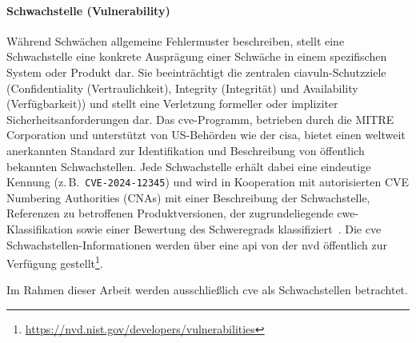 \paragraph{Schwachstelle (Vulnerability)}

Während Schwächen allgemeine Fehlermuster beschreiben, stellt eine Schwachstelle eine konkrete Ausprägung einer Schwäche in einem spezifischen System oder Produkt dar.
Sie beeinträchtigt die zentralen \acrshort{ciavuln}-Schutzziele (Confidentiality (Vertraulichkeit), Integrity (Integrität) und Availability (Verfügbarkeit)) und stellt eine Verletzung formeller oder impliziter Sicherheitsanforderungen dar.
Das \acrshort{cve}-Programm, betrieben durch die MITRE Corporation und unterstützt von US-Behörden wie der \acrfull{cisa}, bietet einen weltweit anerkannten Standard zur Identifikation und Beschreibung von öffentlich bekannten Schwachstellen.
Jede Schwachstelle erhält dabei eine eindeutige Kennung (z.\,B.\ \verb+CVE-2024-12345+) und wird in Kooperation mit autorisierten CVE Numbering Authorities (CNAs) mit einer Beschreibung der Schwachstelle, Referenzen zu betroffenen Produktversionen, der zugrundeliegende \acrshort{cwe}-Klassifikation sowie einer Bewertung des Schweregrads klassifiziert\ \autocite{Ross_Winstead_McEvilley_2022, CveGlossaryCommonVulnerabilitiesAndExposures12mai2025}.
Die \acrshort{cve} Schwachstellen-Informationen werden über eine \acrshort{api} von der \acrshort{nvd} öffentlich zur Verfügung gestellt\footnote{\url{https://nvd.nist.gov/developers/vulnerabilities}}.

Im Rahmen dieser Arbeit werden ausschließlich \acrshort{cve} als Schwachstellen betrachtet.







